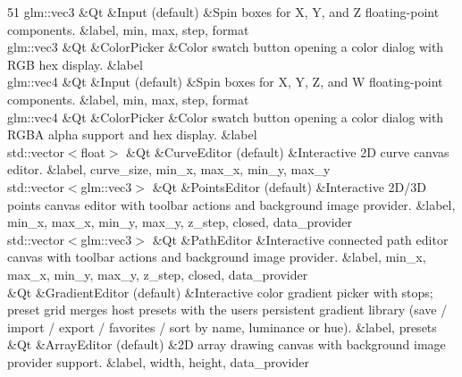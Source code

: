 \begin{DoxyTable}{5}{}{}{1}
glm\+::vec3  &Qt  &Input (default)  &Spin boxes for X, Y, and Z floating-\/point components.  &label, min, max, step, format  \\
glm\+::vec3  &Qt  &Color\+Picker  &Color swatch button opening a color dialog with RGB hex display.  &label  \\
glm\+::vec4  &Qt  &Input (default)  &Spin boxes for X, Y, Z, and W floating-\/point components.  &label, min, max, step, format  \\
glm\+::vec4  &Qt  &Color\+Picker  &Color swatch button opening a color dialog with RGBA alpha support and hex display.  &label  \\
std\+::vector$<$float$>$  &Qt  &Curve\+Editor (default)  &Interactive 2D curve canvas editor.  &label, curve\+\_\+size, min\+\_\+x, max\+\_\+x, min\+\_\+y, max\+\_\+y  \\
std\+::vector$<$glm\+::vec3$>$  &Qt  &Points\+Editor (default)  &Interactive 2D/3D points canvas editor with toolbar actions and background image provider.  &label, min\+\_\+x, max\+\_\+x, min\+\_\+y, max\+\_\+y, z\+\_\+step, closed, data\+\_\+provider  \\
std\+::vector$<$glm\+::vec3$>$  &Qt  &Path\+Editor  &Interactive connected path editor canvas with toolbar actions and background image provider.  &label, min\+\_\+x, max\+\_\+x, min\+\_\+y, max\+\_\+y, z\+\_\+step, closed, data\+\_\+provider  \\
  &Qt  &Gradient\+Editor (default)  &Interactive color gradient picker with stops; preset grid merges host presets with the user\textquotesingle{}s persistent gradient library (save / import / export / favorites / sort by name, luminance or hue).  &label, presets  \\
  &Qt  &Array\+Editor (default)  &2D array drawing canvas with background image provider support.  &label, width, height, data\+\_\+provider  \\
\end{DoxyTable}
